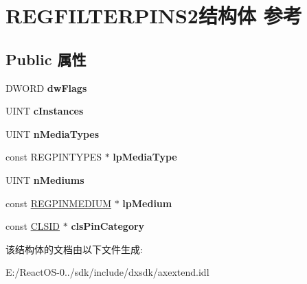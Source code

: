 \hypertarget{struct_r_e_g_f_i_l_t_e_r_p_i_n_s2}{}\section{R\+E\+G\+F\+I\+L\+T\+E\+R\+P\+I\+N\+S2结构体 参考}
\label{struct_r_e_g_f_i_l_t_e_r_p_i_n_s2}
\subsection*{Public 属性}
\begin{DoxyCompactItemize}
\item 
\mbox{\label{struct_r_e_g_f_i_l_t_e_r_p_i_n_s2_a7c4ba21beaeab9d72abff8eadb5eac7e}} 
D\+W\+O\+RD {\bfseries dw\+Flags}
\item 
\mbox{\label{struct_r_e_g_f_i_l_t_e_r_p_i_n_s2_a866987ff97115f2a59b9794918ecf654}} 
U\+I\+NT {\bfseries c\+Instances}
\item 
\mbox{\label{struct_r_e_g_f_i_l_t_e_r_p_i_n_s2_ace6c1f3c229be963bdd8b72ec70d550a}} 
U\+I\+NT {\bfseries n\+Media\+Types}
\item 
\mbox{\label{struct_r_e_g_f_i_l_t_e_r_p_i_n_s2_a992d4302f6cfc0ebd296e4893ed09f7e}} 
const R\+E\+G\+P\+I\+N\+T\+Y\+P\+ES $\ast$ {\bfseries lp\+Media\+Type}
\item 
\mbox{\label{struct_r_e_g_f_i_l_t_e_r_p_i_n_s2_a2ab240b082f9f5da315ef1bd5b58f8bb}} 
U\+I\+NT {\bfseries n\+Mediums}
\item 
\mbox{\label{struct_r_e_g_f_i_l_t_e_r_p_i_n_s2_a6e8e9562a206bd6b2b699aeff050b10f}} 
const \hyperlink{struct_r_e_g_p_i_n_m_e_d_i_u_m}{R\+E\+G\+P\+I\+N\+M\+E\+D\+I\+UM} $\ast$ {\bfseries lp\+Medium}
\item 
\mbox{\label{struct_r_e_g_f_i_l_t_e_r_p_i_n_s2_a6bafa7e4bd5ac7a5e075c417fe644275}} 
const \hyperlink{struct___i_i_d}{C\+L\+S\+ID} $\ast$ {\bfseries cls\+Pin\+Category}
\end{DoxyCompactItemize}


该结构体的文档由以下文件生成\+:\begin{DoxyCompactItemize}
\item 
E\+:/\+React\+O\+S-\/0../sdk/include/dxsdk/axextend.\+idl\end{DoxyCompactItemize}

